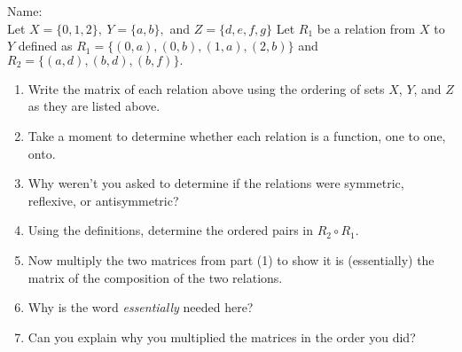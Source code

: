 \documentclass[12pt]{article}
\newcommand{\be}{\begin{enumerate}}
\newcommand{\ee}{\end{enumerate}}
\begin{document}
\thispagestyle{fancy}

\quad
Name: \\

\quad
Let $X=\{0,1,2\},~Y=\{a,b\},$ and $Z=\{d,e,f,g\}$ Let $R_1$ be a relation from $X$ to $Y$ defined as $R_1=\{(0,a),(0,b),(1,a),(2,b)\}$ and $R_2=\{(a,d),(b,d),(b,f)\}.$
\be
\item Write the matrix of each relation above using the ordering of sets $X$, $Y$, and $Z$ as they are listed above.\\
\vfill
\item Take a moment to determine whether each relation is a function, one to one, onto.
\vfill
\item Why weren't you asked to determine if the relations were symmetric, reflexive, or antisymmetric?
\vfill
\item Using the definitions, determine the ordered pairs in $R_2 \circ R_1.$
\vfill
\newpage
\item Now multiply the two matrices from part (1) to show it is (essentially) the matrix of the composition of the two relations. 
\vfill
\item Why is the word \emph{essentially} needed here?
\vfill
\item Can you explain why you multiplied the matrices in the order you did?
\vfill
\ee
\end{document}
